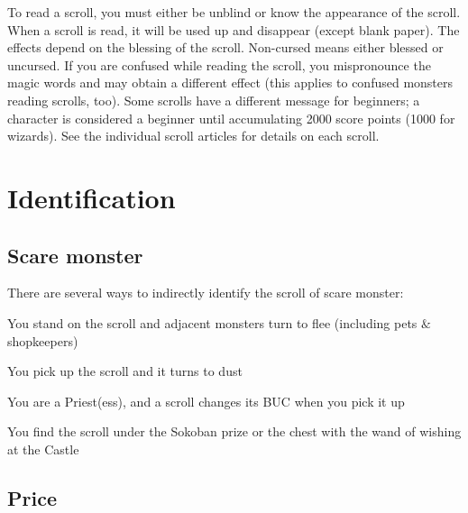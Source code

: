 To read a scroll, you must either be unblind or know the appearance of the scroll. When a scroll is read, it will be used up and disappear (except blank paper). The effects depend on the blessing of the scroll. Non-{}cursed means either blessed or uncursed. If you are confused while reading the scroll, you mispronounce the magic words and may obtain a different effect (this applies to confused monsters reading scrolls, too). Some scrolls have a different message for beginners; a character is considered a beginner until accumulating 2000 score points (1000 for wizards\footnotemark[74]). See the individual scroll articles for details on each scroll.



\section{Identification}
\label{5}
\subsection{Scare monster}
\label{6}
There are several ways to indirectly identify the scroll of scare monster:




\begin{myitemize}\item{}You stand on the scroll and adjacent monsters turn to flee (including pets {\mbox{$\&$}} shopkeepers)
\item{}You pick up the scroll and it turns to dust
\item{}You are a Priest(ess)\footnotemark[75], and a scroll changes its BUC\footnotemark[76] when you pick it up
\item{}You find the scroll under the Sokoban\footnotemark[77] prize or the chest with the wand of wishing at the Castle\footnotemark[78]
\end{myitemize}

\subsection{Price}
\label{7}

